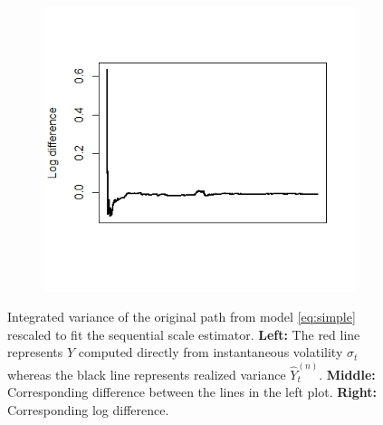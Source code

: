 \documentclass{article}
\begin{document}
\begin{figure}[h]
\begin{subfigure}{0.32\textwidth}
    \end{subfigure}\hfill
    \begin{subfigure}{0.32\textwidth}
        \centering
        \includegraphics[width=\textwidth]{ex5_scale3.jpeg}
    \end{subfigure}
    \caption{Integrated variance of the original path from model \eqref{eq:simple} rescaled to fit the sequential scale estimator. \textbf{Left:} The red line represents $Y$ computed directly from instantaneous volatility $\sigma_t$ whereas the black line represents realized variance $\hat{Y}_t^{(n)}$. \textbf{Middle:} Corresponding difference between the lines in the left plot. \textbf{Right:} Corresponding log difference.}
    \label{fig:ex5scale}
\end{figure}\\\\
\end{document}
